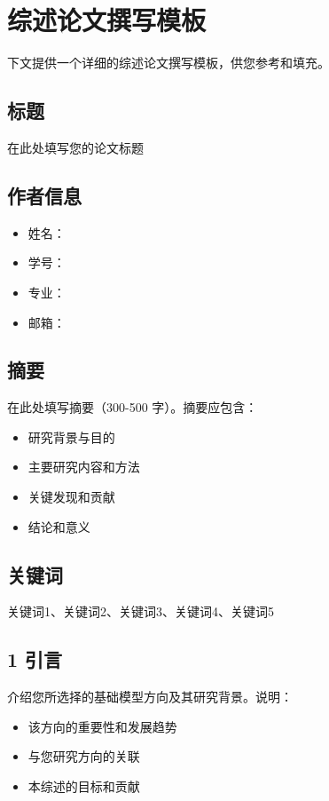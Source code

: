 \documentclass[UTF8]{article}
\begin{document}
\section{综述论文撰写模板}

下文提供一个详细的综述论文撰写模板，供您参考和填充。

\subsection{标题}

在此处填写您的论文标题

\subsection{作者信息}

\begin{itemize}
    \item 姓名：
    \item 学号：
    \item 专业：
    \item 邮箱：
\end{itemize}

\subsection{摘要}

在此处填写摘要（300-500 字）。摘要应包含：
\begin{itemize}
    \item 研究背景与目的
    \item 主要研究内容和方法
    \item 关键发现和贡献
    \item 结论和意义
\end{itemize}

\subsection{关键词}

关键词1、关键词2、关键词3、关键词4、关键词5

\subsection{1 引言}

介绍您所选择的基础模型方向及其研究背景。说明：
\begin{itemize}
    \item 该方向的重要性和发展趋势
    \item 与您研究方向的关联
    \item 本综述的目标和贡献
\end{itemize}
\end{document}
